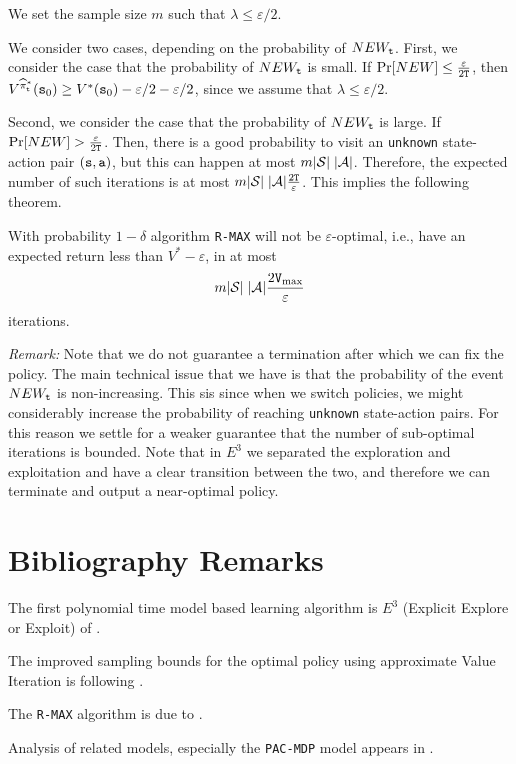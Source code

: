 We set the sample size $m$ such that $\lambda \leq\varepsilon/2$.

We consider two cases, depending on the probability of $NEW_{\tt t}$. First,
we consider the case that the probability of $NEW_{\tt t}$ is small. If
$\Pr[NEW]\leq \frac{\varepsilon}{2{\tt T}}$, then
$V^{\widehat{\pi}^*_{\tt t}}({\tt s}_0)\geq V^*({\tt s}_0)
-\varepsilon/2 -\varepsilon/2$, since we assume that $\lambda\leq
\varepsilon/2$.

Second, we consider the case that the probability of $NEW_{\tt t}$ is large.
If $\Pr[NEW] > \frac{\varepsilon}{2{\tt T}}$. Then, there is a good
probability to visit an \texttt{unknown} state-action pair $({\tt s},{\tt a})$, but this
can happen at most $m|\mathcal{S}|\;|\mathcal{A}|$. Therefore, the expected
number of such iterations is at most
$m|\mathcal{S}|\;|\mathcal{A}|\frac{2{\tt T}}{\varepsilon}$.
This implies the following theorem.

\begin{theorem}
With probability $1-\delta$ algorithm \texttt{R-MAX} will not be $\varepsilon$-optimal, i.e., have an expected return less than $V^*-\varepsilon$, in at most 
\[
m|\mathcal{S}|\;|\mathcal{A}|\frac{2{\tt V}_{\max }}{\varepsilon}
\]
iterations.
\end{theorem}

\noindent\textit{Remark:} Note that we do not guarantee a termination after which we can fix the policy. The main technical issue that we have is that the probability of the event $NEW_{\tt t}$ is non-increasing. This sis since when we switch policies, we might considerably increase the probability of reaching \texttt{unknown} state-action pairs. For this reason we settle for a weaker guarantee that the number of sub-optimal iterations is bounded. Note that in $E^3$ we separated the exploration and exploitation and have a clear transition between the two, and therefore we can terminate and output a near-optimal policy.


\section{Bibliography Remarks}


The first polynomial time model based learning algorithm is $E^3$
(Explicit Explore or Exploit) of \cite{KearnsS02}. 

The improved sampling bounds for the optimal policy using
approximate Value Iteration is following \cite{KearnsS98a}.

The {\tt R-MAX} algorithm is due to \cite{BrafmanT02}.

Analysis of related models, especially the {\tt PAC-MDP} model
appears in \cite{StrehlLL09,Li2012}.
